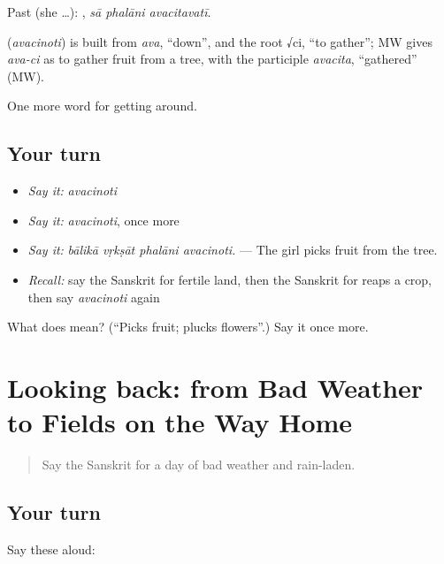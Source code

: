 Past (she …):   , \emph{sā phalāni avacitavatī}.

\begin{cousinweb}
\textbf{} (\emph{avacinoti}) is built from \emph{ava}, \textquotedblleft{}down\textquotedblright{}, and the root √ci, \textquotedblleft{}to gather\textquotedblright{}; MW gives \emph{ava-ci} as to gather fruit from a tree, with the participle \emph{avacita}, \textquotedblleft{}gathered\textquotedblright{} (MW).
\end{cousinweb}

\begin{grammarlens}[title={What you've built}]
One more word for getting around.
\end{grammarlens}

\subsection*{Your turn}
\begin{itemize}
\raggedright
  \item \emph{Say it:} \emph{avacinoti}
  \item \emph{Say it:} \emph{avacinoti}, once more
  \item \emph{Say it:} \emph{bālikā vṛkṣāt phalāni avacinoti.} — The girl picks fruit from the tree.
  \item \emph{Recall:} say the Sanskrit for fertile land, then the Sanskrit for reaps a crop, then say \emph{avacinoti} again
\end{itemize}

\begin{tcolorbox}[breakable,colback=teal!4,colframe=teal!35!black,title={Before you move on}]
What does  mean? (\textquotedblleft{}Picks fruit; plucks flowers\textquotedblright{}.) Say it once more.
\end{tcolorbox}
\section[(dialogue)]{Looking back: from Bad Weather to Fields on the Way Home}

\label{lesson:SA-R447-review-441-447}



\begin{quote}
Say the Sanskrit for a day of bad weather and rain-laden.
\end{quote}

\subsection*{Your turn}
Say these aloud:

